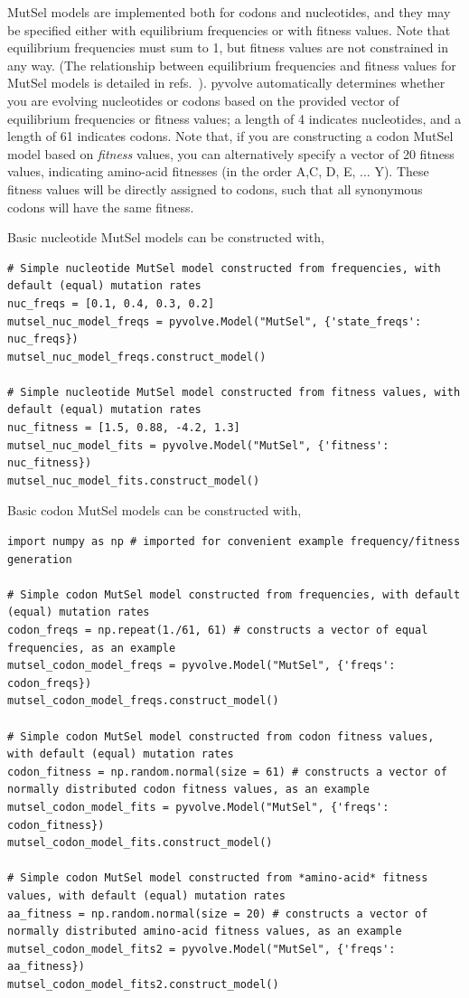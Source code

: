 \documentclass{article}
\begin{document}
MutSel models are implemented both for codons and nucleotides, and they may be specified either with equilibrium frequencies or with fitness values. Note that equilibrium frequencies must sum to 1, but fitness values are not constrained in any way. (The relationship between equilibrium frequencies and fitness values for MutSel models is detailed in refs.\ \citep{HB98,SpielmanWilke2015}). pyvolve automatically determines whether you are evolving nucleotides or codons based on the provided vector of equilibrium frequencies or fitness values; a length of 4 indicates nucleotides, and a length of 61 indicates codons. Note that, if you are constructing a codon MutSel model based on \emph{fitness} values, you can alternatively specify a vector of 20 fitness values, indicating amino-acid fitnesses (in the order A,C, D, E, ... Y). These fitness values will be directly assigned to codons, such that all synonymous codons will have the same fitness.


Basic nucleotide MutSel models can be constructed with,
\begin{lstlisting}
# Simple nucleotide MutSel model constructed from frequencies, with default (equal) mutation rates
nuc_freqs = [0.1, 0.4, 0.3, 0.2]
mutsel_nuc_model_freqs = pyvolve.Model("MutSel", {'state_freqs': nuc_freqs})
mutsel_nuc_model_freqs.construct_model()

# Simple nucleotide MutSel model constructed from fitness values, with default (equal) mutation rates
nuc_fitness = [1.5, 0.88, -4.2, 1.3]
mutsel_nuc_model_fits = pyvolve.Model("MutSel", {'fitness': nuc_fitness})
mutsel_nuc_model_fits.construct_model()
\end{lstlisting}

Basic codon MutSel models can be constructed with,
\begin{lstlisting}
import numpy as np # imported for convenient example frequency/fitness generation

# Simple codon MutSel model constructed from frequencies, with default (equal) mutation rates
codon_freqs = np.repeat(1./61, 61) # constructs a vector of equal frequencies, as an example
mutsel_codon_model_freqs = pyvolve.Model("MutSel", {'freqs': codon_freqs})
mutsel_codon_model_freqs.construct_model()

# Simple codon MutSel model constructed from codon fitness values, with default (equal) mutation rates
codon_fitness = np.random.normal(size = 61) # constructs a vector of normally distributed codon fitness values, as an example
mutsel_codon_model_fits = pyvolve.Model("MutSel", {'freqs': codon_fitness})
mutsel_codon_model_fits.construct_model()

# Simple codon MutSel model constructed from *amino-acid* fitness values, with default (equal) mutation rates
aa_fitness = np.random.normal(size = 20) # constructs a vector of normally distributed amino-acid fitness values, as an example
mutsel_codon_model_fits2 = pyvolve.Model("MutSel", {'freqs': aa_fitness})
mutsel_codon_model_fits2.construct_model()

\end{lstlisting}
\end{document}
